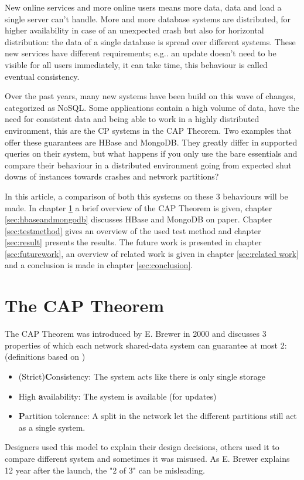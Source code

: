 \documentclass[final,5p,times]{elsarticle}
\begin{document}
New online services and more online users means more data, data and load a single server can't handle. More and more database systems are distributed, for higher availability in case of an unexpected crash but also for horizontal distribution: the data of a single database is spread over different systems. These new services have different requirements; e.g.. an update doesn't need to be visible for all users immediately, it can take time, this behaviour is called eventual consistency. 

Over the past years, many new systems have been build on this wave of changes, categorized as NoSQL. Some applications contain a high volume of data, have the need for consistent data and being able to work in a highly distributed environment, this are the CP systems in the CAP Theorem. Two examples that offer these guarantees are HBase and MongoDB. They greatly differ in supported queries on their system, but what happens if you only use the bare essentials and compare their behaviour in a distributed environment going from expected shut downs of instances towards crashes and network partitions? 

In this article, a comparison of both this systems on these 3 behaviours will be made. In chapter \ref{sec:CAPTheorem} a brief overview of the CAP Theorem is given, chapter \ref{sec:hbaseandmongodb} discusses HBase and MongoDB on paper. Chapter \ref{sec:testmethod} gives an overview of the used test method and chapter \ref{sec:result} presents the results. The future work is presented in chapter \ref{sec:futurework}, an overview of related work is given in chapter \ref{sec:related work} and a conclusion is made in chapter \ref{sec:conclusion}.  

\section{The CAP Theorem\cite{brewer2000towards}\cite{brewer2012cap}}\label{sec:CAPTheorem}
The CAP Theorem was introduced by E. Brewer \cite{brewer2000towards}  in 2000 and discusses 3 properties of which each network shared-data system can guarantee at most 2: (definitions based on \cite{brewer2012cap})
\begin{itemize}
\item (Strict)\textbf{C}onsistency: The system acts like there is only single storage 
\item High \textbf{a}vailability: The system is available (for updates)
\item \textbf{P}artition tolerance: A split in the network let the different partitions still act as a single system. 
\end{itemize}
Designers used this model to explain their design decisions, others used it to compare different system and sometimes it was misused. As E. Brewer explains 12 year after the launch, the "2 of 3" can be misleading.
\end{document}
